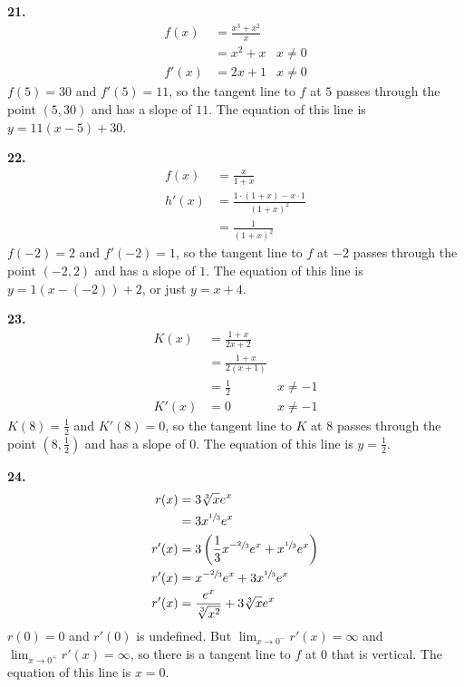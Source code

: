 \documentclass[10pt,oneside,]{book}
\theoremstyle{plain}
\theoremstyle{definition}
\numberwithin{equation}{section}
\newcommand{\fe}[2]{#1\mathopen{}\left(#2\right)\mathclose{}}
\newcommand{\point}[2]{\left(#1,#2\right)}
\newcommand{\fd}[1]{#1'}
\begin{document}
\par\smallskip
\noindent\textbf{21.}\quad{}\begin{align*}
\fe{f}{x}&=\frac{x^3+x^2}{x}\\
&=x^2+x& x\neq0\\
\fe{\fd{f}}{x}&=2x+1& x\neq0
\end{align*}\(\fe{f}{5}=30\) and \(\fe{\fd{f}}{5}=11\), so the tangent line to \(f\) at \(5\) passes through the point \(\point{5}{30}\) and has a slope of \(11\).  The equation of this line is \(y=11(x-5)+30\).%
\par\smallskip
\noindent\textbf{22.}\quad{}\begin{align*}
\fe{f}{x}&=\frac{x}{1+x}\\
\fe{\fd{h}}{x}&=\frac{1\cdot(1+x)-x\cdot1}{(1+x)^2}\\
&=\frac{1}{(1+x)^2}
\end{align*}\(\fe{f}{-2}=2\) and \(\fe{\fd{f}}{-2}=1\), so the tangent line to \(f\) at \(-2\) passes through the point \(\point{-2}{2}\) and has a slope of \(1\).  The equation of this line is \(y=1(x-(-2))+2\), or just \(y=x+4\).%
\par\smallskip
\noindent\textbf{23.}\quad{}\begin{align*}
\fe{K}{x}&=\frac{1+x}{2x+2}\\
&=\frac{1+x}{2(x+1)}\\
&=\frac{1}{2}&x\neq-1\\
\fe{\fd{K}}{x}&=0&x\neq-1
\end{align*}\(\fe{K}{8}=\frac{1}{2}\) and \(\fe{\fd{K}}{8}=0\), so the tangent line to \(K\) at \(8\) passes through the point \(\point{8}{\frac{1}{2}}\) and has a slope of \(0\).  The equation of this line is \(y=\frac{1}{2}\).%
\par\smallskip
\noindent\textbf{24.}\quad{}\begin{align*}
\fe{r}{x}&=3\sqrt[3]{x}e^x\\
&=3x^{\sfrac{1}{3}}e^x\\
\fe{\fd{r}}{x}&=3\left(\frac{1}{3}x^{-\sfrac{2}{3}}e^x+x^{\sfrac{1}{3}}e^x\right)\\
\fe{\fd{r}}{x}&=x^{-\sfrac{2}{3}}e^x+3x^{\sfrac{1}{3}}e^x\\
\fe{\fd{r}}{x}&=\frac{e^x}{\sqrt[3]{x^2}}+3\sqrt[3]{x}e^x
\end{align*}\(\fe{r}{0}=0\) and \(\fe{\fd{r}}{0}\) is undefined. But \(\lim_{x\to0^{-}}\fe{\fd{r}}{x}=\infty\) and \(\lim_{x\to0^{+}}\fe{\fd{r}}{x}=\infty\), so there is a tangent line to \(f\) at \(0\) that is vertical. The equation of this line is \(x=0\).%
\end{document}
